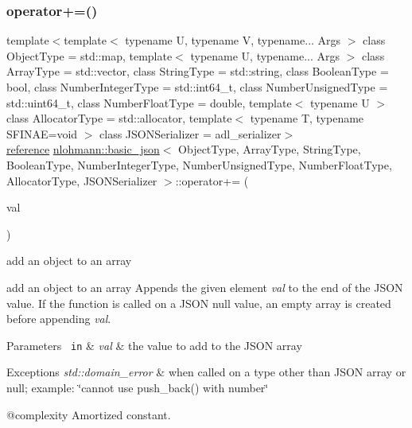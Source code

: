 \subsubsection{\texorpdfstring{operator+=()}{operator+=()}\hspace{0.1cm}{\footnotesize\ttfamily [1/4]}}
{\footnotesize\ttfamily template$<$template$<$ typename U, typename V, typename... Args $>$ class Object\+Type = std\+::map, template$<$ typename U, typename... Args $>$ class Array\+Type = std\+::vector, class String\+Type  = std\+::string, class Boolean\+Type  = bool, class Number\+Integer\+Type  = std\+::int64\+\_\+t, class Number\+Unsigned\+Type  = std\+::uint64\+\_\+t, class Number\+Float\+Type  = double, template$<$ typename U $>$ class Allocator\+Type = std\+::allocator, template$<$ typename T, typename S\+F\+I\+N\+A\+E=void $>$ class J\+S\+O\+N\+Serializer = adl\+\_\+serializer$>$ \\
\mbox{\hyperlink{classnlohmann_1_1basic__json_ac6a5eddd156c776ac75ff54cfe54a5bc}{reference}} \mbox{\hyperlink{classnlohmann_1_1basic__json}{nlohmann\+::basic\+\_\+json}}$<$ Object\+Type, Array\+Type, String\+Type, Boolean\+Type, Number\+Integer\+Type, Number\+Unsigned\+Type, Number\+Float\+Type, Allocator\+Type, J\+S\+O\+N\+Serializer $>$\+::operator+= (\begin{DoxyParamCaption}\item[{\mbox{\hyperlink{classnlohmann_1_1basic__json}{basic\+\_\+json}}$<$ Object\+Type, Array\+Type, String\+Type, Boolean\+Type, Number\+Integer\+Type, Number\+Unsigned\+Type, Number\+Float\+Type, Allocator\+Type, J\+S\+O\+N\+Serializer $>$ \&\&}]{val }\end{DoxyParamCaption})\hspace{0.3cm}{\ttfamily [inline]}}



add an object to an array 

add an object to an array Appends the given element {\itshape val} to the end of the J\+S\+ON value. If the function is called on a J\+S\+ON null value, an empty array is created before appending {\itshape val}.


\begin{DoxyParams}[1]{Parameters}
\mbox{\texttt{ in}}  & {\em val} & the value to add to the J\+S\+ON array\\
\hline
\end{DoxyParams}

\begin{DoxyExceptions}{Exceptions}
{\em std\+::domain\+\_\+error} & when called on a type other than J\+S\+ON array or null; example\+: {\ttfamily \char`\"{}cannot use push\+\_\+back() with number\char`\"{}}\\
\hline
\end{DoxyExceptions}
@complexity Amortized constant.

